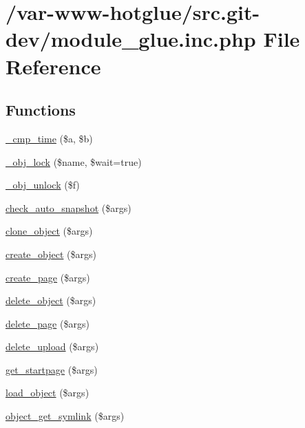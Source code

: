 \hypertarget{module__glue_8inc_8php}{
\section{/var-\/www-\/hotglue/src.git-\/dev/module\_\-glue.inc.php File Reference}
\label{module__glue_8inc_8php}
}
\subsection*{Functions}
\begin{DoxyCompactItemize}
\item 
\hyperlink{module__glue_8inc_8php_a5fea6c120a24a298149febcbf3b1df10}{\_\-cmp\_\-time} (\$a, \$b)
\item 
\hyperlink{module__glue_8inc_8php_a21f260355b875069ca90edf1f9a559d0}{\_\-obj\_\-lock} (\$name, \$wait=true)
\item 
\hyperlink{module__glue_8inc_8php_a73a91facde5362e20df9657d31c2bb06}{\_\-obj\_\-unlock} (\$f)
\item 
\hyperlink{module__glue_8inc_8php_aaa1103a091b9dbca790e77d25a452ca5}{check\_\-auto\_\-snapshot} (\$args)
\item 
\hyperlink{module__glue_8inc_8php_a9c7f39d87787ce288ce3d8a3e389ba95}{clone\_\-object} (\$args)
\item 
\hyperlink{module__glue_8inc_8php_a12aa18f28f86274d770ba90aa88e2c3e}{create\_\-object} (\$args)
\item 
\hyperlink{module__glue_8inc_8php_a9806cd2a9b829a24876b149753e819fb}{create\_\-page} (\$args)
\item 
\hyperlink{module__glue_8inc_8php_a51fdb1d1ff829d6d2d79a9f852b7e0ef}{delete\_\-object} (\$args)
\item 
\hyperlink{module__glue_8inc_8php_af11541a6869804225793b82e54fa09fe}{delete\_\-page} (\$args)
\item 
\hyperlink{module__glue_8inc_8php_aa4865d52ac449f8aaadb3a5d425f2efb}{delete\_\-upload} (\$args)
\item 
\hyperlink{module__glue_8inc_8php_a5dd5e5f68b79a78901c25ce850b3eacf}{get\_\-startpage} (\$args)
\item 
\hyperlink{module__glue_8inc_8php_ac6b5ed5ff055ccb4d07ad17cf78d5a11}{load\_\-object} (\$args)
\item 
\hyperlink{module__glue_8inc_8php_aa9618d306b7ee5bd9e5d6a0be268ed44}{object\_\-get\_\-symlink} (\$args)
\item 

\end{DoxyCompactItemize}
